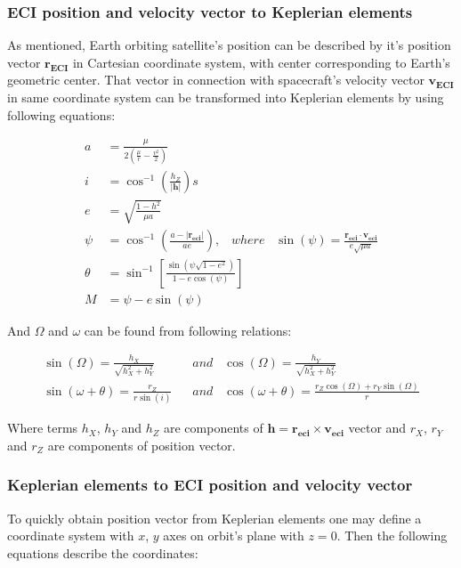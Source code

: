     \subsubsection{ECI position and velocity vector to Keplerian elements}
        As mentioned, Earth orbiting satellite's position can be described by it's position vector $\textbf{r}_{\textbf{ECI}}$ in Cartesian coordinate system, with center corresponding to Earth's geometric center. That vector in connection with spacecraft's velocity vector $\textbf{v}_{\textbf{ECI}}$ in same coordinate system can be transformed into Keplerian elements by using following equations:
        
        \begin{align}
            a &= \frac{\mu}{2\left(\frac{\mu}{r}-\frac{v^2}{2}\right)} \\
            i &= \cos^{-1}\left(\frac{h_Z}{|\textbf{h}|}\right)s \\
            e &= \sqrt{ \frac{1-h^2}{\mu a} } \\
            \psi &= \cos^{-1}\left(\frac{a-|\textbf{r}_{\textbf{eci}}|}{ae}\right), \;\;\; where \;\;\; \sin(\psi) = \frac{\textbf{r}_{\textbf{eci}}\cdot\textbf{v}_{\textbf{eci}}}{e\sqrt{\mu a}} \\
            \theta &= \sin^{-1}\left[\frac{\sin(\psi \sqrt{1-e^2})}{1-e\cos(\psi)}\right] \\
            M & = \psi - e\sin(\psi)
        \end{align}

        And $\Omega$ and $\omega$ can be found from following relations:

        \begin{align}
            \sin(\Omega) = \frac{h_X}{\sqrt{h^2_X+h^2_Y}}\;\;\; & and\;\;\; \cos(\Omega) = \frac{h_Y}{\sqrt{h^2_X+h^2_Y}} \\
            \sin(\omega+\theta) = \frac{r_Z}{r\sin(i)}\;\;\; & and\;\;\; \cos(\omega+\theta) = \frac{r_Z\cos(\Omega)+r_Y\sin(\Omega)}{r}
        \end{align}

        Where terms $h_X$, $h_Y$ and $h_Z$ are components of $\textbf{h}=\textbf{r}_{\textbf{eci}}\times \textbf{v}_{\textbf{eci}}$ vector and $r_X$, $r_Y$ and $r_Z$ are components of position vector.
    
    \subsubsection{Keplerian elements to ECI position and velocity vector}
        To quickly obtain position vector from Keplerian elements one may define a coordinate system with $x$, $y$ axes on orbit's plane with $z=0$. Then the following equations describe the coordinates:

